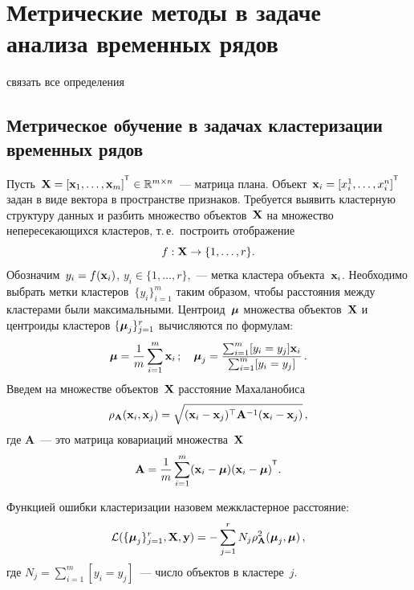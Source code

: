 \chapter{Метрические методы в задаче анализа временных рядов}
\label{ch:metric_learning}

{\color{red} связать все определения}

\section{Метрическое обучение в задачах кластеризации временных рядов}
\label{sec:ch5:metric_learning_clustering}

Пусть~$\bX = [\bx_1, \dots, \bx_m]^{\T} \in \mathbb{R}^{m \times n}$~--- матрица плана.
Объект~$\bx_i = [x_i^1, \ldots, x_i^n]^{\T}$ задан в виде вектора в пространстве признаков.
Требуется выявить кластерную структуру данных и разбить множество объектов~$\mathbf{X}$ на множество непересекающихся кластеров,
т.\,е.\ построить отображение
\[
f: \mathbf{X} \to \{1, \dots, r\}.
\]
Обозначим~$y_i = f (\mathbf{x}_i)$, $y_i \in \{1, \ldots, r\}$,~--- метка кластера объекта~$\mathbf{x}_i$.
Необходимо выбрать метки кластеров~$\{y_i\}_{i=1}^m$ таким образом, чтобы расстояния между кластерами были максимальными.
Центроид~$\boldsymbol{\mu}$ множества объектов~$\mathbf{X}$ и центроиды кластеров $\{\boldsymbol{\mu}_j\}_{j=1}^r$ вычисляются по формулам:
\begin{equation}
\label{mu}
\boldsymbol{\mu} =\frac{1}{m} \sum_{i=1}^m\mathbf{x}_i\,; \quad
\boldsymbol{\mu}_j =\frac{ \sum_{i=1}^m [y_i = y_j]\mathbf{x}_i } {\sum_{i=1}^m [y_i = y_j]}\,.
\end{equation}
Введем на множестве объектов~$\mathbf{X}$ расстояние Махаланобиса
\begin{equation}
\label{metric}
\rho_{\mathbf{A}} (\mathbf{x}_i, \mathbf{x}_j) = \sqrt{(\mathbf{x}_i - \mathbf{x}_j)^{\top} \mathbf{A}^{-1} (\mathbf{x}_i - \mathbf{x}_j)}\,,
\end{equation}
где $\mathbf{A}$~--- это матрица ковариаций множества~$\mathbf{X}$
\begin{equation}
\label{covMatrix}
\bA = \frac{1}{m} \sum_{i=1}^m(\bx_i - \bmu)(\bx_i - \bmu)^{\T}.
\end{equation}
\begin{definition}
	Функцией ошибки кластеризации назовем межкластерное расстояние:
	\begin{equation}
	\mathcal{L}(\{\boldsymbol{\mu}_j\}_{j=1}^r, \mathbf{X}, \mathbf{y})= - \sum_{j=1}^r N_j \rho_{\mathbf{A}}^2(\boldsymbol{\mu}_j, \boldsymbol{\mu})\,,
	\label{eq:cluster_error_function}
	\end{equation}
	где $N_j = \sum_{i=1}^m [y_i = y_j]$~--- число объектов в кластере~$j$.
\end{definition}

